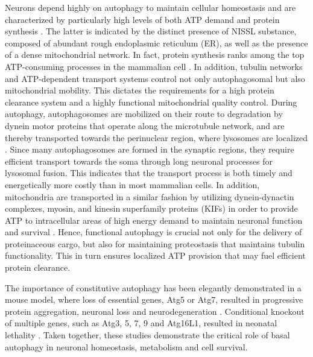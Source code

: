 Neurons depend highly on autophagy to maintain cellular homeostasis and are characterized by particularly high levels of both ATP demand and protein synthesis \citep{Meijer2009,Son2012}. The latter is indicated by the distinct presence of NISSL substance, composed of abundant rough endoplasmic reticulum (ER), as well as the presence of a dense mitochondrial network. In fact, protein synthesis ranks among the top ATP-consuming processes in the mammalian cell 
\citep{Buttgereit1995}. In addition, tubulin networks and ATP-dependent transport systems control not only autophagosomal but also mitochondrial mobility. This dictates the requirements for a high protein clearance system and a highly functional mitochondrial quality control. During autophagy, autophagosomes are mobilized on their route to degradation by dynein motor proteins that operate along the microtubule network, and are thereby transported towards the perinuclear region, where lysosomes are localized \citep{Fass2006,Jahreiss2008,Kimura2008}. Since many autophagosomes are formed in the synaptic regions, they require efficient transport towards the soma through long neuronal processes for lysosomal fusion. This indicates that the transport process is both timely and energetically more costly than in most mammalian cells. In addition, mitochondria are transported in a similar fashion by utilizing dynein-dynactin complexes, myosin, and kinesin superfamily proteins (KIFs) in order to provide ATP to intracellular areas of high energy demand to maintain neuronal function and survival \citep{Lin2015,Sheng2012}. Hence, functional autophagy is crucial not only for the delivery of proteinaceous cargo, but also for maintaining proteostasis that maintains tubulin functionality. This in turn ensures localized ATP provision that may fuel efficient protein clearance. 

The importance of constitutive autophagy has been elegantly demonstrated in a mouse model, where loss of essential genes, Atg5 or Atg7, resulted in progressive protein aggregation, neuronal loss and neurodegeneration \citep{Hara2006,Komatsu2006}. Conditional knockout of multiple genes, such as Atg3, 5, 7, 9 and Atg16L1, resulted in neonatal lethality \citep{Mizushima2010}. Taken together, these studies demonstrate the critical role of basal autophagy in neuronal homeostasis, metabolism and cell survival. 

